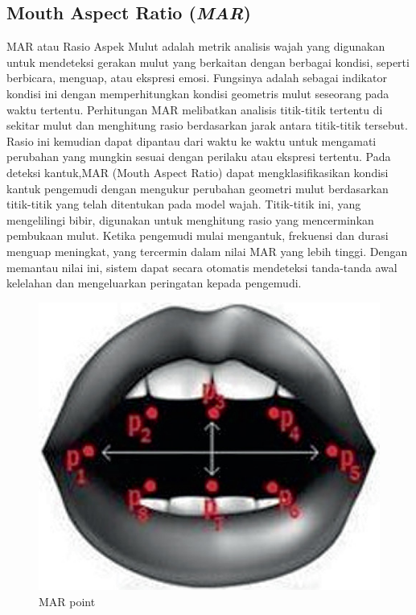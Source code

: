 \subsection{Mouth Aspect Ratio (\emph{MAR})}
\label{subsec:MAR}

MAR atau Rasio Aspek Mulut adalah metrik analisis wajah yang 
digunakan untuk mendeteksi gerakan mulut yang berkaitan dengan 
berbagai kondisi, seperti berbicara, menguap, atau ekspresi emosi. 
Fungsinya adalah sebagai indikator kondisi ini dengan 
memperhitungkan kondisi geometris mulut seseorang pada waktu 
tertentu. Perhitungan MAR melibatkan analisis titik-titik 
tertentu di sekitar mulut dan menghitung rasio berdasarkan jarak 
antara titik-titik tersebut. Rasio ini kemudian dapat dipantau 
dari waktu ke waktu untuk mengamati perubahan yang mungkin sesuai 
dengan perilaku atau ekspresi tertentu. Pada deteksi kantuk,MAR (Mouth Aspect Ratio) dapat mengklasifikasikan kondisi kantuk pengemudi dengan mengukur perubahan geometri mulut berdasarkan titik-titik yang telah ditentukan pada model wajah. Titik-titik ini, yang mengelilingi bibir, digunakan untuk menghitung rasio yang mencerminkan pembukaan mulut. Ketika pengemudi mulai mengantuk, frekuensi dan durasi menguap meningkat, yang tercermin dalam nilai MAR yang lebih tinggi. Dengan memantau nilai ini, sistem dapat secara otomatis mendeteksi tanda-tanda awal kelelahan dan mengeluarkan peringatan kepada pengemudi.

\begin{figure} [H] \centering
  \includegraphics[scale=0.3]{gambar/2_2_3.png}
  \caption{MAR point}
  \label{fig:MAR}
\end{figure}


